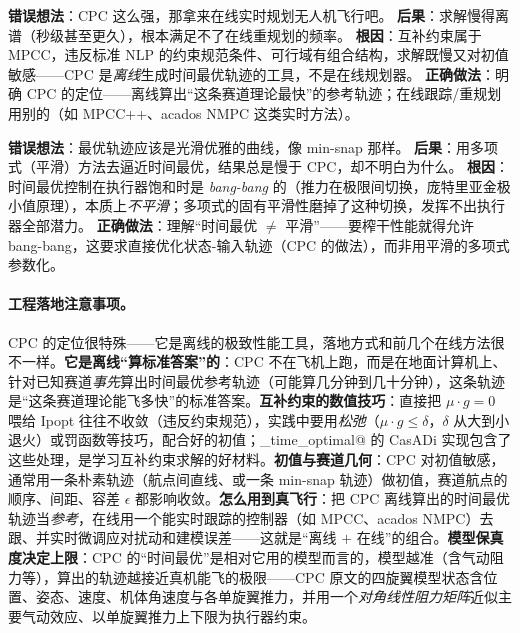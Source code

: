 \begin{pitfall}
\textbf{错误想法}：CPC 这么强，那拿来在线实时规划无人机飞行吧。\;
\textbf{后果}：求解慢得离谱（秒级甚至更久），根本满足不了在线重规划的频率。\;
\textbf{根因}：互补约束属于 MPCC，违反标准 NLP 的约束规范条件、可行域有组合结构，求解既慢又对初值敏感——CPC 是\emph{离线}生成时间最优轨迹的工具，不是在线规划器。\;
\textbf{正确做法}：明确 CPC 的定位——离线算出“这条赛道理论最快”的参考轨迹；在线跟踪/重规划用别的（如 MPCC++、acados NMPC 这类实时方法）。
\end{pitfall}

\begin{pitfall}
\textbf{错误想法}：最优轨迹应该是光滑优雅的曲线，像 min-snap 那样。\;
\textbf{后果}：用多项式（平滑）方法去逼近时间最优，结果总是慢于 CPC，却不明白为什么。\;
\textbf{根因}：时间最优控制在执行器饱和时是 \emph{bang-bang} 的（推力在极限间切换，庞特里亚金极小值原理），本质上\emph{不平滑}；多项式的固有平滑性磨掉了这种切换，发挥不出执行器全部潜力。\;
\textbf{正确做法}：理解“时间最优 $\ne$ 平滑”——要榨干性能就得允许 bang-bang，这要求直接优化状态-输入轨迹（CPC 的做法），而非用平滑的多项式参数化。
\end{pitfall}

\paragraph{工程落地注意事项。}
CPC 的定位很特殊——它是离线的极致性能工具，落地方式和前几个在线方法很不一样。\textbf{它是离线“算标准答案”的}：CPC 不在飞机上跑，而是在地面计算机上、针对已知赛道\emph{事先}算出时间最优参考轨迹（可能算几分钟到几十分钟），这条轨迹是“这条赛道理论能飞多快”的标准答案。\textbf{互补约束的数值技巧}：直接把 $\mu\cdot g=0$ 喂给 Ipopt 往往不收敛（违反约束规范），实践中要用\emph{松弛}（$\mu\cdot g\le\delta$，$\delta$ 从大到小退火）或罚函数等技巧，配合好的初值；\verb@rpg_time_optimal@ 的 CasADi 实现包含了这些处理，是学习互补约束求解的好材料。\textbf{初值与赛道几何}：CPC 对初值敏感，通常用一条朴素轨迹（航点间直线、或一条 min-snap 轨迹）做初值，赛道航点的顺序、间距、容差 $\epsilon$ 都影响收敛。\textbf{怎么用到真飞行}：把 CPC 离线算出的时间最优轨迹当\emph{参考}，在线用一个能实时跟踪的控制器（如 MPCC、acados NMPC）去跟、并实时微调应对扰动和建模误差——这就是“离线 $+$ 在线”的组合。\textbf{模型保真度决定上限}：CPC 的“时间最优”是相对它用的模型而言的，模型越准（含气动阻力等），算出的轨迹越接近真机能飞的极限——CPC 原文的四旋翼模型状态含位置、姿态、速度、机体角速度与各单旋翼推力，并用一个\emph{对角线性阻力矩阵}近似主要气动效应、以单旋翼推力上下限为执行器约束。


